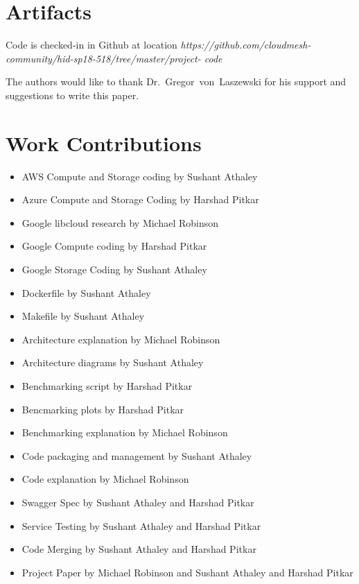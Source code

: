 \section{Artifacts}

Code is checked-in in Github at location
\emph{https://github.com/cloudmesh-community/hid-sp18-518/tree/master/project-
code}

\begin{acks}

  The authors would like to thank Dr.~Gregor~von~Laszewski for his
  support and suggestions to write this paper.

\end{acks}


 

\section{Work Contributions}
\begin{itemize}
\item
AWS Compute and Storage coding by Sushant Athaley
\item
Azure Compute and Storage Coding by Harshad Pitkar
\item
Google libcloud research by Michael Robinson
\item
Google Compute coding by Harshad Pitkar
\item
Google Storage Coding by Sushant Athaley
\item
Dockerfile by Sushant Athaley
\item
Makefile by Sushant Athaley
\item
Architecture explanation by Michael Robinson
\item
Architecture diagrams by Sushant Athaley
\item
Benchmarking script by Harshad Pitkar
\item
Bencmarking plots by Harshad Pitkar
\item
Benchmarking explanation by Michael Robinson
\item
Code packaging and management by Sushant Athaley
\item
Code explanation by Michael Robinson
\item
Swagger Spec by Sushant Athaley and Harshad Pitkar
\item
Service Testing by Sushant Athaley and Harshad Pitkar
\item
Code Merging by Sushant Athaley and Harshad Pitkar
\item
Project Paper by Michael Robinson and Sushant Athaley and Harshad Pitkar
\end{itemize}


